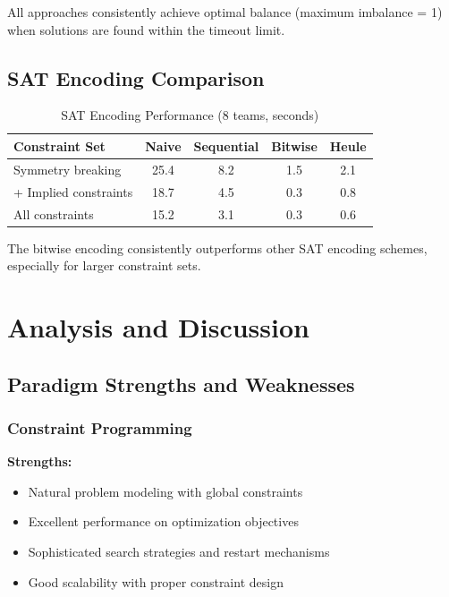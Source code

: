 \documentclass[11pt]{article}
\begin{document}
All approaches consistently achieve optimal balance (maximum imbalance = 1) when solutions are found within the timeout limit.

\subsection{SAT Encoding Comparison}

\begin{table}[H]
\centering
\caption{SAT Encoding Performance (8 teams, seconds)}
\label{tab:sat_encodings}
\begin{tabular}{@{}lcccc@{}}
\toprule
\textbf{Constraint Set} & \textbf{Naive} & \textbf{Sequential} & \textbf{Bitwise} & \textbf{Heule} \\
\midrule
Symmetry breaking       & 25.4 & 8.2  & 1.5  & 2.1  \\
+ Implied constraints   & 18.7 & 4.5  & 0.3  & 0.8  \\
All constraints         & 15.2 & 3.1  & 0.3  & 0.6  \\
\bottomrule
\end{tabular}
\end{table}

The bitwise encoding consistently outperforms other SAT encoding schemes, especially for larger constraint sets.

\section{Analysis and Discussion}

\subsection{Paradigm Strengths and Weaknesses}

\subsubsection{Constraint Programming}
\textbf{Strengths:}
\begin{itemize}
    \item Natural problem modeling with global constraints
    \item Excellent performance on optimization objectives
    \item Sophisticated search strategies and restart mechanisms
    \item Good scalability with proper constraint design
\end{itemize}
\end{document}
